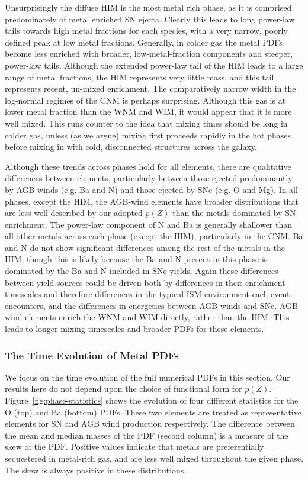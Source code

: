 Unsurprisingly the diffuse HIM is the most metal rich phase, as it is comprised predominately of metal enriched SN ejecta. Clearly this leads to long power-law tails towards high metal fractions for each species, with a very narrow, poorly defined peak at low metal fractions. Generally, in colder gas the metal PDFs become less enriched with broader, low-metal-fraction components and steeper, power-law tails. Although the extended power-law tail of the HIM leads to a large range of metal fractions, the HIM represents very little mass, and this tail represents recent, un-mixed enrichment. The comparatively narrow width in the log-normal regimes of the CNM is perhaps surprising. Although this gas is at lower metal fraction than the WNM and WIM, it would appear that it is more well mixed. This runs counter to the idea that mixing times should be long in colder gas, unless (as we argue) mixing first proceeds rapidly in the hot phases before mixing in with cold, disconnected structures across the galaxy.

Although these trends across phases hold for all elements, there are qualitative differences between elements, particularly between those ejected predominantly by AGB winds (e.g. Ba and N) and those ejected by SNe (e.g. O and Mg). In all phases, except the HIM, the AGB-wind elements have broader distributions that are less well described by our adopted $p(Z)$ than the metals dominated by SN enrichment. The power-law component of N and Ba is generally shallower than all other metals across each phase (except the HIM), particularly in the CNM. Ba and N do not show significant differences among the rest of the metals in the HIM, though this is likely because the Ba and N present in this phase is dominated by the Ba and N included in SNe yields. Again these differences between yield sources could be driven both by differences in their enrichment timescales and therefore differences in the typical ISM environment each event encounters, and the differences in energetics between AGB winds and SNe. AGB wind elements enrich the WNM and WIM directly, rather than the HIM. This leads to longer mixing timescales and broader PDFs for these elements.

\subsubsection{The Time Evolution of Metal PDFs}
\label{sec:statistics}
We focus on the time evolution of the full numerical PDFs in this section. Our results here do not depend upon the choice of functional form for $p(Z)$. Figure~\ref{fig:phase-statistics} shows the evolution of four different statistics for the O (top) and Ba (bottom) PDFs. These two elements are treated as representative elements for SN and AGB wind production respectively. The difference between the mean and median masses of the PDF (second column) is a measure of the skew of the PDF. Positive values indicate that metals are preferentially sequestered in metal-rich gas, and are less well mixed throughout the given phase. The skew is always positive in these distributions.

